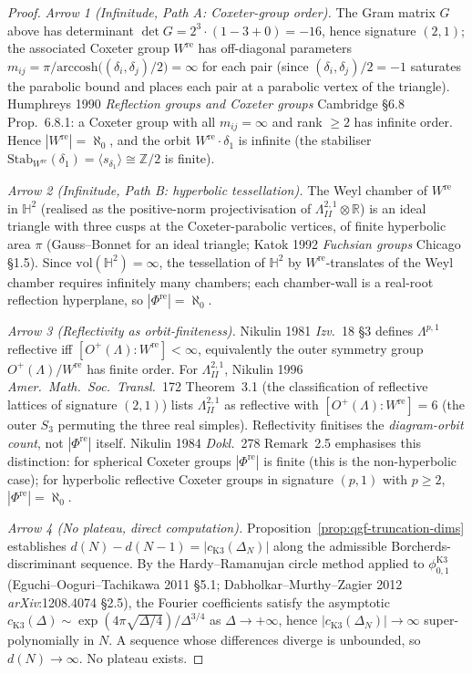 \begin{proof}
\emph{Arrow 1 (Infinitude, Path A: Coxeter-group order).} The Gram
matrix $G$ above has determinant $\det G=2^3\cdot(1-3+0)=-16$, hence
signature $(2,1)$; the associated Coxeter group $W^{\mathrm{re}}$ has
off-diagonal parameters
$m_{ij}=\pi/\mathrm{arccosh}\bigl((\delta_i,\delta_j)/2\bigr)
=\infty$ for each pair (since $(\delta_i,\delta_j)/2=-1$ saturates the
parabolic bound and places each pair at a parabolic vertex of the
triangle). Humphreys 1990 \emph{Reflection groups and Coxeter groups}
Cambridge \S6.8 Prop.~6.8.1: a Coxeter group with all $m_{ij}=\infty$
and rank $\ge 2$ has infinite order. Hence
$|W^{\mathrm{re}}|=\aleph_0$, and the orbit
$W^{\mathrm{re}}\cdot\delta_1$ is infinite (the stabiliser
$\mathrm{Stab}_{W^{\mathrm{re}}}(\delta_1)=\langle s_{\delta_1}\rangle\cong
\mathbb Z/2$ is finite).

\emph{Arrow 2 (Infinitude, Path B: hyperbolic tessellation).} The
Weyl chamber of $W^{\mathrm{re}}$ in $\mathbb H^2$ (realised as the
positive-norm projectivisation of $\Lambda^{2,1}_{II}\otimes\mathbb R$)
is an ideal triangle with three cusps at the Coxeter-parabolic
vertices, of finite hyperbolic area $\pi$ (Gauss--Bonnet for an ideal
triangle; Katok 1992 \emph{Fuchsian groups} Chicago \S1.5). Since
$\mathrm{vol}(\mathbb H^2)=\infty$, the tessellation of $\mathbb H^2$
by $W^{\mathrm{re}}$-translates of the Weyl chamber requires
infinitely many chambers; each chamber-wall is a real-root reflection
hyperplane, so $|\Phi^{\mathrm{re}}|=\aleph_0$.

\emph{Arrow 3 (Reflectivity as orbit-finiteness).} Nikulin 1981
\emph{Izv.}~18 \S3 defines $\Lambda^{p,1}$ reflective iff
$[O^+(\Lambda):W^{\mathrm{re}}]<\infty$, equivalently the outer
symmetry group $O^+(\Lambda)/W^{\mathrm{re}}$ has finite order. For
$\Lambda^{2,1}_{II}$, Nikulin 1996 \emph{Amer.~Math.~Soc.~Transl.}~172
Theorem~3.1 (the classification of reflective lattices of signature
$(2,1)$) lists $\Lambda^{2,1}_{II}$ as reflective with
$[O^+(\Lambda):W^{\mathrm{re}}]=6$ (the outer $S_3$ permuting the
three real simples). Reflectivity finitises the \emph{diagram-orbit
count}, not $|\Phi^{\mathrm{re}}|$ itself. Nikulin 1984
\emph{Dokl.}~278 Remark~2.5 emphasises this distinction: for spherical
Coxeter groups $|\Phi^{\mathrm{re}}|$ is finite (this is the
non-hyperbolic case); for hyperbolic reflective Coxeter groups in
signature $(p,1)$ with $p\ge 2$, $|\Phi^{\mathrm{re}}|=\aleph_0$.

\emph{Arrow 4 (No plateau, direct computation).}
Proposition~\ref{prop:qgf-truncation-dims} establishes
$d(N)-d(N-1)=|c_{\mathrm{K3}}(\Delta_N)|$ along the admissible
Borcherds-discriminant sequence. By the Hardy--Ramanujan circle method
applied to $\phi_{0,1}^{\mathrm{K3}}$ (Eguchi--Ooguri--Tachikawa 2011
\S5.1; Dabholkar--Murthy--Zagier 2012 \emph{arXiv}:1208.4074 \S2.5),
the Fourier coefficients satisfy the asymptotic
$c_{\mathrm{K3}}(\Delta)\sim\exp(4\pi\sqrt{\Delta/4})/\Delta^{3/4}$
as $\Delta\to+\infty$, hence $|c_{\mathrm{K3}}(\Delta_N)|\to\infty$
super-polynomially in $N$. A sequence whose differences diverge is
unbounded, so $d(N)\to\infty$. No plateau exists.


\end{proof}
